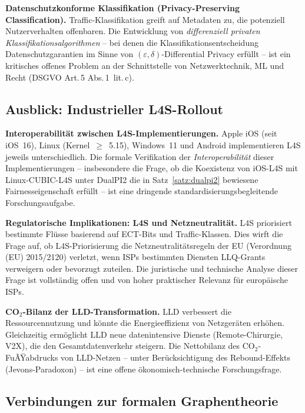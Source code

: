 ﻿\documentclass[a4paper,12pt]{article}
\theoremstyle{definition}
\begin{document}
\textbf{Datenschutzkonforme Klassifikation (Privacy-Preserving Classification).}
Traffic-Klassifikation greift auf Metadaten zu, die potenziell Nutzerverhalten
offenbaren. Die Entwicklung von \emph{differenziell privaten
Klassifikationsalgorithmen} -- bei denen die Klassifikationsentscheidung
Datenschutzgarantien im Sinne von $(\varepsilon, \delta)$-Differential Privacy
erf\"{u}llt -- ist ein kritisches offenes Problem an der Schnittstelle von
Netzwerktechnik, ML und Recht (DSGVO Art.\,5 Abs.\,1~lit.\,c).

\subsection{Ausblick: Industrieller L4S-Rollout}

\textbf{Interoperabilit\"{a}t zwischen L4S-Implementierungen.}
Apple iOS (seit iOS~16), Linux (Kernel~$\geq$~5.15), Windows~11 und Android
implementieren L4S jeweils unterschiedlich. Die formale Verifikation der
\emph{Interoperabilit\"{a}t} dieser Implementierungen -- insbesondere die
Frage, ob die Koexistenz von iOS-L4S mit Linux-CUBIC-L4S unter DualPI2
die in Satz~\ref{satz:dualpi2} bewiesene Fairnesseigenschaft erf\"{u}llt -- ist
eine dringende standardisierungsbegleitende Forschungsaufgabe.

\textbf{Regulatorische Implikationen: L4S und Netzneutralit\"{a}t.}
L4S priorisiert bestimmte Fl\"{u}sse basierend auf ECT-Bits und Traffic-Klassen.
Dies wirft die Frage auf, ob L4S-Priorisierung die Netzneutralit\"{a}tsregeln
der EU (Verordnung (EU) 2015/2120) verletzt, wenn ISPs bestimmten Diensten
LLQ-Grants verweigern oder bevorzugt zuteilen. Die juristische und technische
Analyse dieser Frage ist vollst\"{a}ndig offen und von hoher praktischer Relevanz
f\"{u}r europ\"{a}ische ISPs.

\textbf{CO$_2$-Bilanz der LLD-Transformation.}
LLD verbessert die Ressourcennutzung und k\"{o}nnte die Energieeffizienz von
Netzger\"{a}ten erh\"{o}hen. Gleichzeitig erm\"{o}glicht LLD neue daten\-intensive
Dienste (Remote-Chirurgie, V2X), die den Gesamtdatenverkehr steigern. Die
Nettobilanz des CO$_2$-FuÃŸabdrucks von LLD-Netzen -- unter Ber\"{u}cksichtigung
des Rebound-Effekts (Jevons-Paradoxon) -- ist eine offene \"{o}konomisch-technische
Forschungsfrage.

\subsection{Verbindungen zur formalen Graphentheorie}
\end{document}
